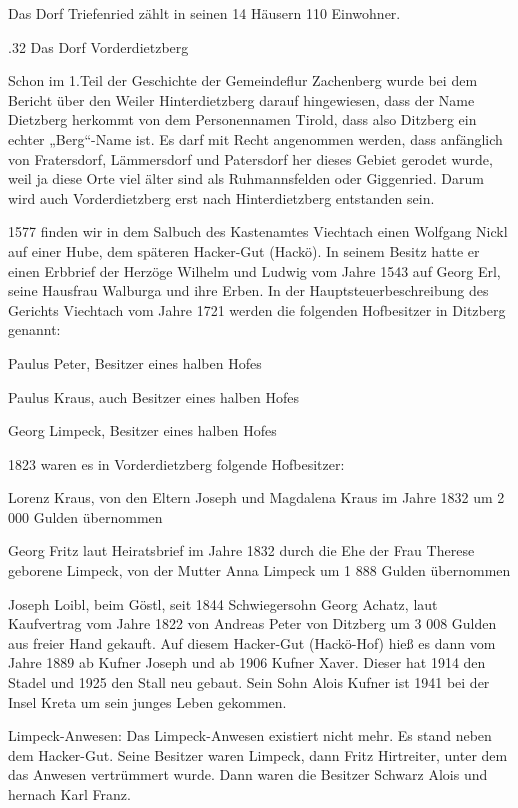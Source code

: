 \documentclass{book}
\begin{document}
Das Dorf Triefenried zählt in seinen 14 Häusern 110 Einwohner.

.32 Das Dorf Vorderdietzberg

Schon im 1.Teil der Geschichte der Gemeindeflur Zachenberg wurde bei dem Bericht
über den Weiler Hinterdietzberg darauf hingewiesen, dass der Name Dietzberg
herkommt von dem Personennamen Tirold, dass also Ditzberg ein echter „Berg“-Name
ist. Es darf mit Recht angenommen werden, dass anfänglich von Fratersdorf,
Lämmersdorf und Patersdorf her dieses Gebiet gerodet wurde, weil ja diese Orte
viel älter sind als Ruhmannsfelden oder Giggenried. Darum wird auch
Vorderdietzberg erst nach Hinterdietzberg entstanden sein.

1577 finden wir in dem Salbuch des Kastenamtes Viechtach einen Wolfgang Nickl
auf einer Hube, dem späteren Hacker-Gut (Hackö). In seinem Besitz hatte er einen
Erbbrief der Herzöge Wilhelm und Ludwig vom Jahre 1543 auf Georg Erl, seine
Hausfrau Walburga und ihre Erben. In der Hauptsteuerbeschreibung des Gerichts
Viechtach vom Jahre 1721 werden die folgenden Hofbesitzer in Ditzberg genannt:



Paulus Peter, Besitzer eines halben Hofes

Paulus Kraus, auch Besitzer eines halben Hofes

Georg Limpeck, Besitzer eines halben Hofes



1823 waren es in Vorderdietzberg folgende Hofbesitzer:



Lorenz Kraus, von den Eltern Joseph und Magdalena Kraus im Jahre 1832 um 2 000
Gulden übernommen

Georg Fritz laut Heiratsbrief im Jahre 1832 durch die Ehe der Frau Therese
geborene Limpeck, von der Mutter Anna Limpeck um 1 888 Gulden übernommen

Joseph Loibl, beim Göstl, seit 1844 Schwiegersohn Georg Achatz, laut Kaufvertrag
vom Jahre 1822 von Andreas Peter von Ditzberg um 3 008 Gulden aus freier Hand
gekauft. Auf diesem Hacker-Gut (Hackö-Hof) hieß es dann vom Jahre 1889 ab Kufner
Joseph und ab 1906 Kufner Xaver. Dieser hat 1914 den Stadel und 1925 den Stall
neu gebaut. Sein Sohn Alois Kufner ist 1941 bei der Insel Kreta um sein junges
Leben gekommen.



Limpeck-Anwesen: Das Limpeck-Anwesen existiert nicht mehr. Es stand neben dem
Hacker-Gut. Seine Besitzer waren Limpeck, dann Fritz Hirtreiter, unter dem das
Anwesen vertrümmert wurde. Dann waren die Besitzer Schwarz Alois und hernach
Karl Franz.
\end{document}
